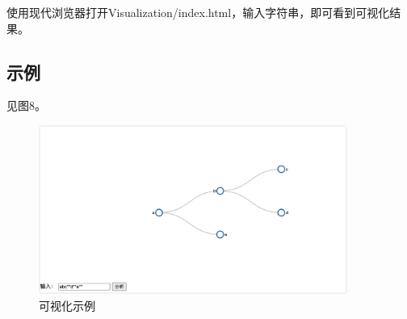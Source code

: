 \documentclass{article}
\begin{document}
使用现代浏览器打开Visualization/index.html，输入字符串，即可看到可视化结果。

\subsection{示例}

见图8。

\begin{figure}[htbp]
    
    \centering\includegraphics[width=0.9\textwidth]{./Images/pic4_1_3.png}
    
    \caption{可视化示例}
    
\end{figure}
\end{document}
